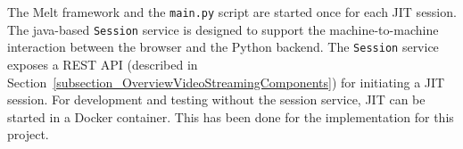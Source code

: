 \documentclass[../MasterThesis.tex]{subfiles}
\begin{document}
The Melt framework and the \texttt{main.py} script are started once for each JIT session.
The java-based \texttt{Session} service is designed to support the machine-to-machine interaction between the browser and the Python backend. 
The \texttt{Session} service exposes a REST API (described in Section~\ref{subsection_OverviewVideoStreamingComponents}) for initiating a JIT session. 
%
%
%
%
%
%
%
%
%
For development and testing without the session service, JIT can be started in a Docker container. This has been done for the implementation for this project.


\end{document}
